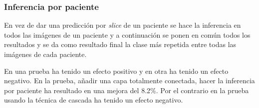 \documentclass{beamer}
\begin{document}
\begin{frame}
\frametitle{Inferencia por paciente}

En vez de dar una predicción por \textit{slice} de un paciente se hace la inferencia en todos las imágenes de un paciente y a continuación se ponen en común todos los resultados y se da como resultado final la clase más repetida entre todas las imágenes de cada paciente.

\begin{table}[H]
\centering
{}
\caption{Resultados inferencia por paciente.}
\end{table}

En una prueba ha tenido un efecto positivo y en otra ha tenido un efecto negativo. En la prueba, añadir una capa totalmente conectada, hacer la inferencia por paciente ha resultado en una mejora del 8.2\%. Por el contrario en la prueba usando la técnica de cascada ha tenido un efecto negativo.

\end{frame}
\end{document}
